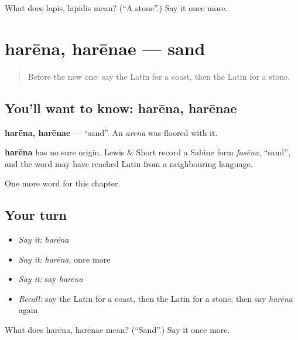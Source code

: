 \begin{tcolorbox}[breakable,colback=teal!4,colframe=teal!35!black,title={Before you move on}]
What does lapis, lapidis mean? (\textquotedblleft{}A stone\textquotedblright{}.) Say it once more.
\end{tcolorbox}
\section[harēna, harēnae]{harēna, harēnae — sand}

\label{lesson:LA-C88-harena}



\begin{quote}
Before the new one: say the Latin for a coast, then the Latin for a stone.
\end{quote}

\subsection*{You'll want to know: harēna, harēnae}
\textbf{harēna, harēnae} — \textquotedblleft{}sand\textquotedblright{}. An \emph{arena} was floored with it.

\begin{cousinweb}
\textbf{harēna} has no sure origin. Lewis \& Short record a Sabine form \emph{fasēna}, \textquotedblleft{}sand\textquotedblright{}, and the word may have reached Latin from a neighbouring language.
\end{cousinweb}

\begin{grammarlens}[title={What you've built}]
One more word for this chapter.
\end{grammarlens}

\subsection*{Your turn}
\begin{itemize}
\raggedright
  \item \emph{Say it:} \emph{harēna}
  \item \emph{Say it:} \emph{harēna}, once more
  \item \emph{Say it:} say \emph{harēna}
  \item \emph{Recall:} say the Latin for a coast, then the Latin for a stone, then say \emph{harēna} again
\end{itemize}

\begin{tcolorbox}[breakable,colback=teal!4,colframe=teal!35!black,title={Before you move on}]
What does harēna, harēnae mean? (\textquotedblleft{}Sand\textquotedblright{}.) Say it once more.
\end{tcolorbox}
